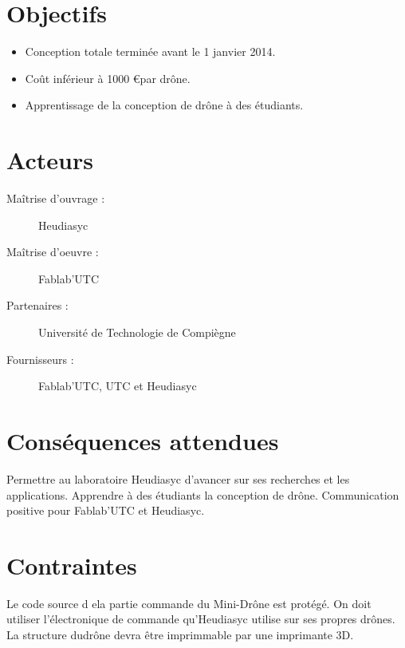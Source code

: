 \documentclass[a4paper, 12pt, leqno]{report}
\theoremstyle{plain}
\begin{document}
        \section{Objectifs}
        \begin{itemize}
        \item Conception totale terminée avant le 1 janvier 2014.
        \item Coût inférieur à 1000 \euro par drône.
        \item Apprentissage de la conception de drône à des étudiants.
        \end{itemize}

        \section{Acteurs}
        \begin{description}
        \item[Maîtrise d'ouvrage :] Heudiasyc
        \item[Maîtrise d'oeuvre :] Fablab'UTC
        \item[Partenaires :] Université de Technologie de Compiègne
        \item[Fournisseurs :] Fablab'UTC, UTC et Heudiasyc
        \end{description}
        \section{Conséquences attendues}
        Permettre au laboratoire Heudiasyc d'avancer sur ses recherches et les applications.
        Apprendre à des étudiants la conception de drône.
        Communication positive pour Fablab'UTC et Heudiasyc.
        
        \section{Contraintes}
        Le code source d ela partie commande du Mini-Drône est protégé.
        On doit utiliser l'électronique de commande qu'Heudiasyc utilise sur ses propres drônes.
        La structure dudrône devra être imprimmable par une imprimante 3D.
\end{document}
